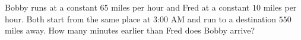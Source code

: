 Bobby runs at a constant $65$ miles per hour and Fred at a constant $10$ miles per hour. Both start from the same place at 3:00 AM and run to a destination $550$ miles away. How many minutes earlier than Fred does Bobby arrive?

